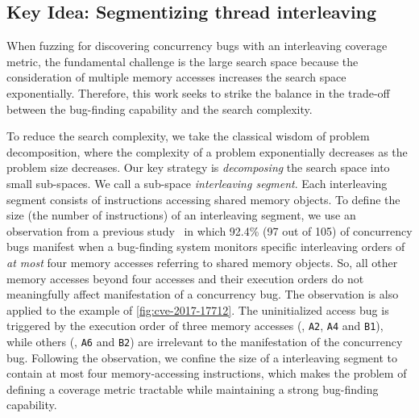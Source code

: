 \subsection{Key Idea: Segmentizing thread interleaving}
\label{ss:overview}


When fuzzing for discovering concurrency bugs with an interleaving
coverage metric, the fundamental challenge is the large search space
because the consideration of multiple memory accesses increases the
search space exponentially.
%
Therefore, this work seeks to strike the balance in the trade-off
between the bug-finding capability and the search complexity.

%
To reduce the search complexity, we take the classical wisdom of
problem decomposition, where the complexity of a problem exponentially
decreases as the problem size decreases.
%
Our key strategy is \textit{decomposing} the search space into small
sub-spaces. We call a sub-space \textit{interleaving segment}.
%
Each interleaving segment consists of instructions accessing 
shared memory objects.
To define the size (the number of instructions) of an interleaving segment,
we use an observation from a previous study~\cite{learningfrommistakes} 
in which 92.4\% (97 out of 105) of concurrency bugs manifest when a bug-finding system
monitors specific interleaving orders of \textit{at most} four memory
accesses referring to shared memory objects.
%
So, all other memory accesses beyond four accesses and their execution
orders do not meaningfully affect manifestation of a concurrency bug.
%
The observation is also applied to the example of
\autoref{fig:cve-2017-17712}. The uninitialized access bug is
triggered by the execution order of three memory accesses (\eg,
\texttt{A2}, \texttt{A4} and \texttt{B1}), while others (\eg,
\texttt{A6} and \texttt{B2}) are irrelevant to the manifestation of
the concurrency bug.
Following the observation,  we confine the size of a interleaving segment 
to contain at most four memory-accessing instructions,
which makes the problem of defining a coverage metric tractable while maintaining a strong bug-finding capability.


